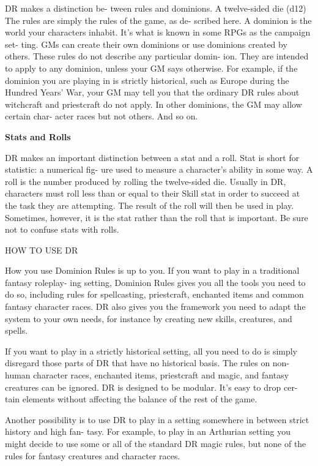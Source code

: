 \documentclass[11pt,twocolumn]{book}
\begin{document}
DR makes a distinction be- tween rules and dominions.
A twelve-sided die (d12)
The rules are simply the rules of the game, as de- scribed here.
A dominion is the world your characters inhabit. It’s what is known in some RPGs as the campaign set- ting. GMs can create their own dominions or use dominions created by others.
These rules do not describe any particular domin- ion. They are intended to apply to any dominion, unless your GM says otherwise. For example, if the dominion you are playing in is strictly historical, such as Europe during the Hundred Years’ War, your GM may tell you that the ordinary DR rules about witchcraft and priestcraft do not apply. In other dominions, the GM may allow certain char- acter races but not others. And so on.

\textbf{Stats and Rolls}

DR makes an important distinction between a stat and a roll. Stat is short for statistic: a numerical fig- ure used to measure a character’s ability in some way. A roll is the number produced by rolling the twelve-sided die.
Usually in DR, characters must roll less than or equal to their Skill stat in order to succeed at the task they are attempting. The result of the roll will then be used in play. Sometimes, however, it is the stat rather than the roll that is important. Be sure not to confuse stats with rolls.

HOW TO USE DR

How you use Dominion Rules is up to you.
If you want to play in a traditional fantasy roleplay- ing setting, Dominion Rules gives you all the tools you need to do so, including rules for spellcasting, priestcraft, enchanted items and common fantasy character races. DR also gives you the framework you need to adapt the system to your own needs, for instance by creating new skills, creatures, and spells.

If you want to play in a strictly historical setting, all you need to do is simply disregard those parts of DR that have no historical basis. The rules on non- human character races, enchanted items, priestcraft and magic, and fantasy creatures can be ignored. DR is designed to be modular. It’s easy to drop cer- tain elements without affecting the balance of the rest of the game.

Another possibility is to use DR to play in a setting somewhere in between strict history and high fan- tasy. For example, to play in an Arthurian setting you might decide to use some or all of the standard DR magic rules, but none of the rules for fantasy creatures and character races.
\end{document}
